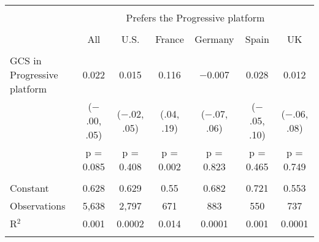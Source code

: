 
\begin{tabular}{@{\extracolsep{5pt}}lcccccc} 
\\[-1.8ex]\hline 
\hline \\[-1.8ex] 
 & \multicolumn{6}{c}{Prefers the Progressive platform} \\ 
\cline{2-7} 
\\[-1.8ex] & All & U.S. & France & Germany & Spain & UK \\ 
\hline \\[-1.8ex] 
 GCS in Progressive platform & 0.022 & 0.015 & 0.116 & $-$0.007 & 0.028 & 0.012 \\ 
  & ($-$.00, .05) & ($-$.02, .05) & (.04, .19) & ($-$.07, .06) & ($-$.05, .10) & ($-$.06, .08) \\ 
  & p = 0.085 & p = 0.408 & p = 0.002 & p = 0.823 & p = 0.465 & p = 0.749 \\ 
 \hline \\[-1.8ex] 
Constant & 0.628 & 0.629 & 0.55 & 0.682 & 0.721 & 0.553 \\ 
Observations & 5,638 & 2,797 & 671 & 883 & 550 & 737 \\ 
R$^{2}$ & 0.001 & 0.0002 & 0.014 & 0.0001 & 0.001 & 0.0001 \\ 
\hline 
\hline \\[-1.8ex] 
\end{tabular} 